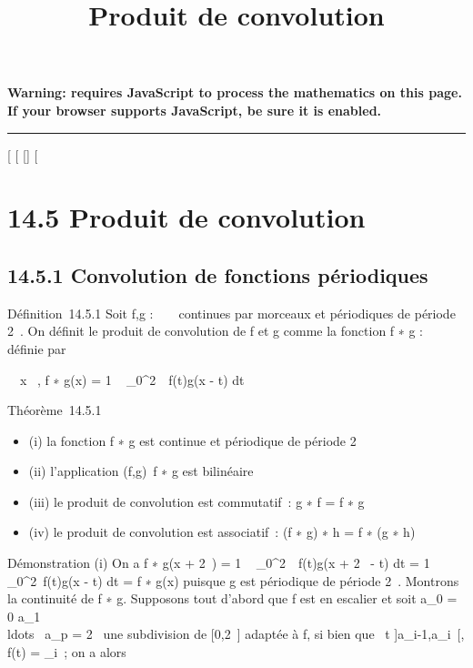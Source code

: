 \documentclass[]{article}
\title{Produit de convolution}
\author{}
\date{}
\begin{document}
\maketitle

\textbf{Warning: 
requires JavaScript to process the mathematics on this page.\\ If your
browser supports JavaScript, be sure it is enabled.}

\begin{center}\rule{3in}{0.4pt}\end{center}

[
[
[]
[

\section{14.5 Produit de convolution}

\subsection{14.5.1 Convolution de fonctions périodiques}

Définition~14.5.1 Soit f,g : ~ \rightarrow~  continues par morceaux et périodiques
de période 2\pi~. On définit le produit de convolution de f et g comme la
fonction f ∗ g : ~ \rightarrow~  définie par

\forall~~x \in {}~, f ∗ g(x) = 1 \pi~ \int  _0^2\pi~~f(t)g(x - t) dt

Théorème~14.5.1

\begin{itemize}
\itemsep1pt\parskip0pt
\item
  (i) la fonction f ∗ g est continue et périodique de période 2\pi~
\item
  (ii) l'application (f,g)\mapsto~f ∗ g est
  bilinéaire
\item
  (iii) le produit de convolution est commutatif~: g ∗ f = f ∗ g
\item
  (iv) le produit de convolution est associatif~: (f ∗ g) ∗ h = f ∗ (g ∗
  h)
\end{itemize}

Démonstration (i) On a f ∗ g(x + 2\pi~) = 1 \pi~
\int  _0^2\pi~~f(t)g(x + 2\pi~ - t) dt
= 1 \pi~ \int ~
_0^2\pi~f(t)g(x - t) dt = f ∗ g(x) puisque g est périodique
de période 2\pi~. Montrons la continuité de f ∗ g. Supposons tout d'abord
que f est en escalier et soit a_0 = 0 \leq a_1
\leq\\ldots~ \leq
a_p = 2\pi~ une subdivision de [0,2\pi~] adaptée à f, si bien que
\forall~t \in]a_i-1,a_i~[, f(t) =
\lambda_i~; on a alors
\end{document}
